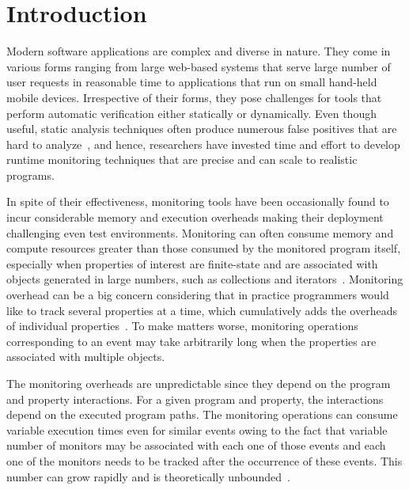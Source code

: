 \section{Introduction}
\label{sec:introduction}

Modern software applications are complex and diverse in nature. They come in 
various forms ranging from large web-based systems that serve large number of 
user requests in reasonable time to applications that run on small hand-held 
mobile devices. Irrespective of their forms, they pose challenges for tools that 
perform automatic verification either statically or dynamically. Even though 
useful, static analysis techniques often produce numerous false positives 
that are hard to analyze~\cite{}, and hence, researchers have invested time and 
effort to develop runtime monitoring techniques that are precise and can scale 
to realistic programs.

In spite of their effectiveness, monitoring tools have been occasionally found 
to incur considerable memory and execution overheads making their deployment 
challenging even
test environments.
Monitoring can often consume memory and compute resources 
greater than those 
consumed by the monitored program itself,
especially when properties of interest are finite-state  and are associated with objects 
generated in large numbers, such as collections and iterators~\cite{}. 
Monitoring overhead can be a big concern considering that in practice 
programmers would like to track several properties at a time, which cumulatively 
adds the overheads of individual properties~\cite{}. To make matters worse, 
monitoring operations corresponding to an event may take arbitrarily long when 
the properties are associated with multiple objects.

The monitoring overheads are unpredictable since they depend on the program and 
property interactions. For a given program and property, the interactions depend 
on the executed program paths. The monitoring operations can consume variable 
execution times even for similar events owing to the fact that variable number 
of monitors may be associated with each one of those events and each one of the 
monitors needs to be tracked after the occurrence of these events. This number 
can grow rapidly and is theoretically unbounded~\cite{}.


